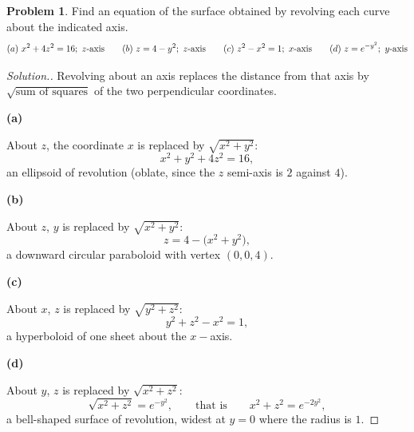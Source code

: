 \documentclass[11pt,a4paper]{article}
\theoremstyle{definition}
\newtheorem{problemx}{Problem}[subsection]
\newenvironment{problem}{\begin{problemx}}{\end{problemx}}
\newenvironment{solution}
  {\renewcommand{\qedsymbol}{}\begin{proof}[\textit{Solution}.]}
  {\end{proof}}
\newcommand{\subhead}[1]{%
  \par\medskip\noindent\textbf{#1}\par\nobreak\smallskip}
\begin{document}
\begin{problem}
Find an equation of the surface obtained by revolving each curve about the
indicated axis.
$$(a)\ x^2+4z^2 = 16;\ z\text{-axis}\hspace{0.7cm}
(b)\ z = 4-y^2;\ z\text{-axis}\hspace{0.7cm}
(c)\ z^2-x^2 = 1;\ x\text{-axis}\hspace{0.7cm}
(d)\ z = e^{-y^2};\ y\text{-axis}$$
\end{problem}
\begin{solution}
Revolving about an axis replaces the distance from that axis by
$\sqrt{\text{sum of squares}}$ of the two perpendicular coordinates.

\subhead{(a)} About $z$, the coordinate $x$ is replaced by
$\sqrt{x^2+y^2}$:
$$x^2+y^2+4z^2 = 16 ,$$
an ellipsoid of revolution (oblate, since the $z$ semi-axis is $2$ against $4$).

\subhead{(b)} About $z$, $y$ is replaced by $\sqrt{x^2+y^2}$:
$$z = 4-\big(x^2+y^2\big),$$
a downward circular paraboloid with vertex $(0,0,4)$.

\subhead{(c)} About $x$, $z$ is replaced by $\sqrt{y^2+z^2}$:
$$y^2+z^2-x^2 = 1 ,$$
a hyperboloid of one sheet about the $x-$axis.

\subhead{(d)} About $y$, $z$ is replaced by $\sqrt{x^2+z^2}$:
$$\sqrt{x^2+z^2} = e^{-y^2},\qquad\text{that is}\qquad
x^2+z^2 = e^{-2y^2},$$
a bell-shaped surface of revolution, widest at $y=0$ where the radius is $1$.
\end{solution}
\end{document}
